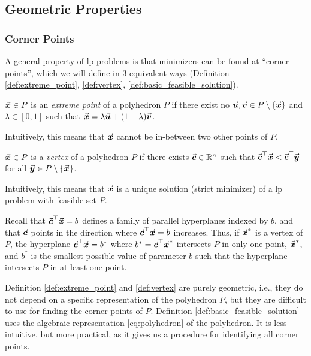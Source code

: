 \subsection{Geometric Properties}\label{sec:geometric_properties_linear_programming}
\subsubsection{Corner Points}\label{sec:corner_points_linear_programming}
A general property of \gls{lp} problems is that minimizers can be found at ``corner points'', which we will define in 3 equivalent ways (Definition \ref{def:extreme_point}, \ref{def:vertex}, \ref{def:basic_feasible_solution}).
\begin{definition}\label{def:extreme_point}
\(\vec{\boldsymbol{x}} \in P\) is an \emph{extreme point} of a polyhedron \(P\) if there exist no \(\vec{\boldsymbol{u}},\vec{\boldsymbol{v}} \in P \setminus \{\vec{\boldsymbol{x}}\}\) and \(\lambda \in [0,1]\) such that
\(
  \vec{\boldsymbol{x}} = \lambda \vec{\boldsymbol{u}} + (1-\lambda) \vec{\boldsymbol{v}}
\).
\end{definition}
Intuitively, this means that \(\vec{\boldsymbol{x}}\) cannot be in-between two other points of \(P\).
\begin{definition}[Vertex]\label{def:vertex}
\(\vec{\boldsymbol{x}} \in P\) is a \emph{vertex} of a polyhedron \(P\) if there exists \(\vec{\boldsymbol{c}} \in \mathbb{R}^{n}\) such that
\(
  \vec{\boldsymbol{c}}^\top \vec{\boldsymbol{x}} < \vec{\boldsymbol{c}}^\top \vec{\boldsymbol{y}}
\)
for all \(\vec{\boldsymbol{y}} \in P\setminus\{\vec{\boldsymbol{x}}\}\).
\end{definition}
Intuitively, this means that \(\vec{\boldsymbol{x}}\) is a unique solution (strict minimizer) of a \gls{lp} problem with feasible set \(P\).

Recall that \(\vec{\boldsymbol{c}}^\top \vec{\boldsymbol{x}} = b\) defines a family of parallel hyperplanes indexed by \(b\), and that \(\vec{\boldsymbol{c}}\) points in the direction where \(\vec{\boldsymbol{c}}^\top \vec{\boldsymbol{x}} = b\) increases.
Thus, if \(\vec{\boldsymbol{x}}^\ast\) is a vertex of \(P\), the hyperplane \(\vec{\boldsymbol{c}}^\top \vec{\boldsymbol{x}} = b^\ast\) where \(b^\ast = \vec{\boldsymbol{c}}^\top \vec{\boldsymbol{x}}^\ast\) intersects \(P\) in only one point, \(\vec{\boldsymbol{x}}^\ast\), and \(b^\ast\) is the smallest possible value of parameter \(b\) such that the hyperplane intersects \(P\) in at least one point.

Definition \ref{def:extreme_point} and \ref{def:vertex} are purely geometric, i.e., they do not depend on a specific representation of the polyhedron \(P\), but they are difficult to use for finding the corner points of \(P\).
Definition \ref{def:basic_feasible_solution} uses the algebraic representation \eqref{eq:polyhedron} of the polyhedron.
It is less intuitive, but more practical, as it gives us a procedure for identifying all corner points.

